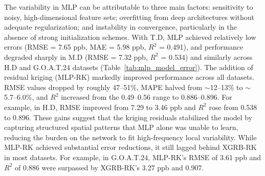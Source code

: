\begin{table}[h!]
\end{table} The variability in MLP can be attributable to three main factors: sensitivity to noisy, high-dimensional feature sets; overfitting from deep architectures without adequate regularization; and instability in convergence, particularly in the absence of strong initialization schemes. With T.D, MLP achieved relatively low errors (RMSE = 7.65 ppb, MAE = 5.98 ppb, $R^{2}$ = 0.491), and performance degraded sharply in M.D (RMSE = 7.32 ppb, $R^{2}$ = 0.534) and similarly across H.D and G.O.A.T.24 datasets (Table~\ref{tab:mlp_model_error}). The addition of residual kriging (MLP-RK) markedly improved performance across all datasets. RMSE values dropped by roughly 47–51\%, MAPE halved from $\sim$12–13\% to $\sim$5.7–6.0\%, and $R^{2}$ increased from the 0.49–0.56 range to 0.886–0.896. For example, in H.D, RMSE improved from 7.29 to 3.46 ppb and $R^{2}$ rose from 0.538 to 0.896. These gains suggest that the kriging residuals stabilized the model by capturing structured spatial patterns that MLP alone was unable to learn, reducing the burden on the network to fit high-frequency local variability. While MLP-RK achieved substantial error reductions, it still lagged behind XGRB-RK in most datasets. For example, in G.O.A.T.24, MLP-RK’s RMSE of 3.61 ppb and $R^{2}$ of 0.886 were surpassed by XGRB-RK’s 3.27 ppb and 0.907. 

